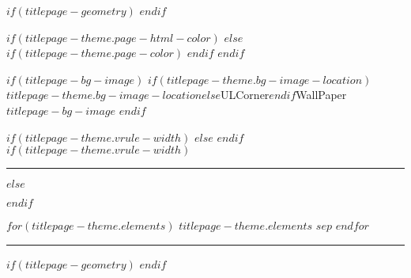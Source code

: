 \newcommand{\headerblock}{
$if(titlepage-header)$
{\titlepageheaderalign
\titlepageheaderfont
{\noindent $titlepage-header$}\\
}
\newlength{\afterheader}
\setlength{\afterheader}{$if(titlepage-theme.header-space-after)$$titlepage-theme.header-space-after$$else$0pt$endif$}

\vspace{\afterheader}
$else$$endif$
}

$if(titlepage-geometry)$
$endif$

$if(titlepage-theme.page-html-color)$
\pagecolor{pgcolor}\afterpage{\nopagecolor}
$else$
$if(titlepage-theme.page-color)$
\pagecolor{pgcolor}\afterpage{\nopagecolor}
$endif$
$endif$

$if(titlepage-bg-image)$
\newlength{\bgimagesize}
\setlength{\bgimagesize}{$if(titlepage-theme.bg-image-size)$$titlepage-theme.bg-image-size$$else$\paperwidth$endif$}
\LENGTHDIVIDE{\bgimagesize}{\paperwidth}{\theRatio} %
\This$if(titlepage-theme.bg-image-location)$$titlepage-theme.bg-image-location$$else$ULCorner$endif$WallPaper{\theRatio}{$titlepage-bg-image$}
$endif$

\thispagestyle{empty} %
\titlepagefont

$if(titlepage-theme.vrule-width)$
\newlength{\A}
\setlength{\A}{$titlepage-theme.vrule-width$}
\newlength{\B}
\setlength{\B}{\ifdim\A > 0pt $titlepage-theme.vrule-space$\else 0pt\fi}
\newlength{\minipagewidth}
{%
\setlength{\minipagewidth}{\textwidth - \A - \B - 0.1\textwidth}
}{
\setlength{\minipagewidth}{\textwidth - 2\A - 2\B - 0.1\textwidth}
}
$else$
\newlength{\minipagewidth}
\setlength{\minipagewidth}{\textwidth}
$endif$
$if(titlepage-theme.vrule-width)$
{%
\raggedleft %
\rule{\A}{\textheight} %
\hspace{\B} %
}{%
\raggedright}
$else$
\raggedright
$endif$
\begin{minipage}[b][\textheight][s]{\minipagewidth}
\titlepagepagealign
$for(titlepage-theme.elements)$
$titlepage-theme.elements$
$sep$
$endfor$
\end{minipage}

%
{%
\hspace{\B}
\rule{\A}{\textheight}
}{}
$if(titlepage-geometry)$
\restoregeometry
$endif$
